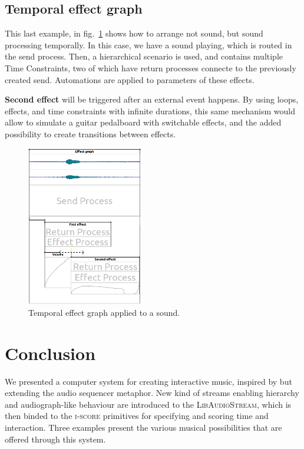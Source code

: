 \documentclass{article}
\newcommand*{\LibAudioStream}{\textsc{LibAudioStream}\xspace}
\newcommand*{\iscore}{\textsc{i-score}\xspace}
\begin{document}
\subsection{Temporal effect graph}
This last example, in fig.~\ref{fig.score3} shows how to arrange not sound, but sound processing temporally.
In this case, we have a sound playing, which is routed in the send process.
Then, a hierarchical scenario is used, and contains multiple Time Constraints, two of which have return processes connecte to the previously created send.
Automations are applied to parameters of these effects.

\textbf{Second effect} will be triggered after an external event happens.
By using loops, effects, and time constraints with infinite durations, this same mechanism would allow to simulate a guitar pedalboard with switchable effects, and the added possibility to create transitions between effects.

\begin{figure}[h]
    \centering
    \includegraphics[width=0.45\textwidth]{figures/ex3.png}
    \caption{Temporal effect graph applied to a sound.}
    \label{fig.score3}
\end{figure}

\section{Conclusion}
We presented a computer system for creating interactive music, inspired 
by but extending the audio sequencer metaphor.
New kind of streams enabling hierarchy and audiograph-like behaviour are introduced to the \LibAudioStream, which is then binded to the \iscore primitives for specifying and scoring time and interaction.
Three examples present the various musical possibilities that are offered
through this system.
\end{document}
